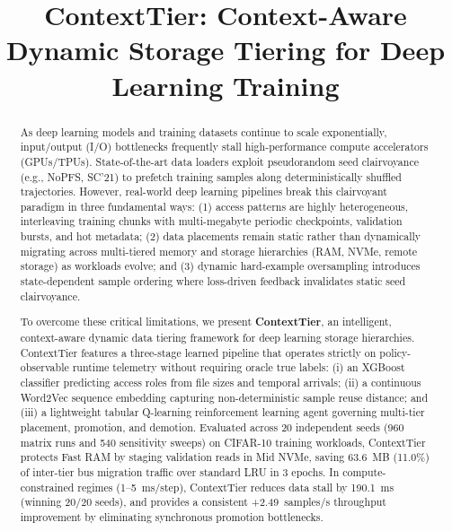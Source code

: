 \documentclass[conference]{IEEEtran}
\begin{document}
\title{ContextTier: Context-Aware Dynamic Storage Tiering for Deep Learning Training}

\author{
\and
{}
\and
{}
\and
{}
}

\maketitle

\begin{abstract}
As deep learning models and training datasets continue to scale exponentially, input/output (I/O) bottlenecks frequently stall high-performance compute accelerators (GPUs/TPUs). State-of-the-art data loaders exploit pseudorandom seed clairvoyance (e.g., NoPFS, SC'21) to prefetch training samples along deterministically shuffled trajectories. However, real-world deep learning pipelines break this clairvoyant paradigm in three fundamental ways: (1) access patterns are highly heterogeneous, interleaving training chunks with multi-megabyte periodic checkpoints, validation bursts, and hot metadata; (2) data placements remain static rather than dynamically migrating across multi-tiered memory and storage hierarchies (RAM, NVMe, remote storage) as workloads evolve; and (3) dynamic hard-example oversampling introduces state-dependent sample ordering where loss-driven feedback invalidates static seed clairvoyance. 

To overcome these critical limitations, we present \textbf{ContextTier}, an intelligent, context-aware dynamic data tiering framework for deep learning storage hierarchies. ContextTier features a three-stage learned pipeline that operates strictly on policy-observable runtime telemetry without requiring oracle true labels: (i) an XGBoost classifier predicting access roles from file sizes and temporal arrivals; (ii) a continuous Word2Vec sequence embedding capturing non-deterministic sample reuse distance; and (iii) a lightweight tabular Q-learning reinforcement learning agent governing multi-tier placement, promotion, and demotion. Evaluated across 20 independent seeds (960 matrix runs and 540 sensitivity sweeps) on CIFAR-10 training workloads, ContextTier protects Fast RAM by staging validation reads in Mid NVMe, saving 63.6~MB (11.0\%) of inter-tier bus migration traffic over standard LRU in 3 epochs. In compute-constrained regimes (1--5~ms/step), ContextTier reduces data stall by 190.1~ms (winning 20/20 seeds), and provides a consistent +2.49~samples/s throughput improvement by eliminating synchronous promotion bottlenecks.
\end{abstract}
\end{document}
